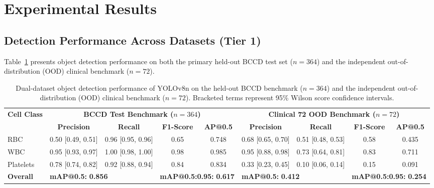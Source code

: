\documentclass[10pt,conference]{IEEEtran}
\newcommand{\nBCCD}{364}
\newcommand{\nClin}{72}
\begin{document}
\section{Experimental Results}
\label{sec:results}

\subsection{Detection Performance Across Datasets (Tier 1)}
Table~\ref{tab:detection} presents object detection performance on both the primary held-out BCCD test set ($n = \nBCCD{}$) and the independent out-of-distribution (OOD) clinical benchmark ($n = \nClin{}$).

\begin{table}[!t]
\centering
\caption{Dual-dataset object detection performance of YOLOv8n on the held-out BCCD benchmark ($n = 364$) and the independent out-of-distribution (OOD) clinical benchmark ($n = 72$). Bracketed terms represent 95\% Wilson score confidence intervals.}
\label{tab:detection}
\setlength{\tabcolsep}{6pt}
\renewcommand{\arraystretch}{1.15}
\begin{tabular}{lcccccccc}
\toprule
\multirow{2}{*}{\textbf{Cell Class}} & \multicolumn{4}{c}{\textbf{BCCD Test Benchmark ($n = 364$)}} & \multicolumn{4}{c}{\textbf{Clinical 72 OOD Benchmark ($n = 72$)}} \\
\cmidrule(lr){2-5} \cmidrule(lr){6-9}
& \textbf{Precision} & \textbf{Recall} & \textbf{F1-Score} & \textbf{AP@0.5} & \textbf{Precision} & \textbf{Recall} & \textbf{F1-Score} & \textbf{AP@0.5} \\
\midrule
RBC       & 0.50 [0.49, 0.51] & 0.96 [0.95, 0.96] & 0.65 & 0.748 & 0.68 [0.65, 0.70] & 0.51 [0.48, 0.53] & 0.58 & 0.435 \\
WBC       & 0.95 [0.93, 0.97] & 1.00 [0.98, 1.00] & 0.98 & 0.985 & 0.95 [0.88, 0.98] & 0.73 [0.64, 0.81] & 0.83 & 0.711 \\
Platelets & 0.78 [0.74, 0.82] & 0.92 [0.88, 0.94] & 0.84 & 0.834 & 0.33 [0.23, 0.45] & 0.10 [0.06, 0.14] & 0.15 & 0.091 \\
\midrule
\textbf{Overall} & \multicolumn{2}{l}{\textbf{mAP@0.5:} \textbf{0.856}} & \multicolumn{2}{l}{\textbf{mAP@0.5:0.95:} \textbf{0.617}} & \multicolumn{2}{l}{\textbf{mAP@0.5:} \textbf{0.412}} & \multicolumn{2}{l}{\textbf{mAP@0.5:0.95:} \textbf{0.254}} \\
\bottomrule
\end{tabular}
\end{table}
\end{document}
